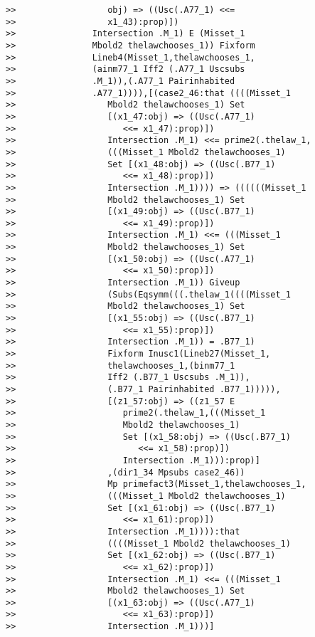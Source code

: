 \documentclass[12pt]{article}
\begin{document}
\begin{verbatim}
>>                  obj) => ((Usc(.A77_1) <<=
>>                  x1_43):prop)])
>>               Intersection .M_1) E (Misset_1
>>               Mbold2 thelawchooses_1)) Fixform
>>               Lineb4(Misset_1,thelawchooses_1,
>>               (ainm77_1 Iff2 (.A77_1 Uscsubs
>>               .M_1)),(.A77_1 Pairinhabited
>>               .A77_1)))),[(case2_46:that ((((Misset_1
>>                  Mbold2 thelawchooses_1) Set
>>                  [(x1_47:obj) => ((Usc(.A77_1)
>>                     <<= x1_47):prop)])
>>                  Intersection .M_1) <<= prime2(.thelaw_1,
>>                  (((Misset_1 Mbold2 thelawchooses_1)
>>                  Set [(x1_48:obj) => ((Usc(.B77_1)
>>                     <<= x1_48):prop)])
>>                  Intersection .M_1)))) => ((((((Misset_1
>>                  Mbold2 thelawchooses_1) Set
>>                  [(x1_49:obj) => ((Usc(.B77_1)
>>                     <<= x1_49):prop)])
>>                  Intersection .M_1) <<= (((Misset_1
>>                  Mbold2 thelawchooses_1) Set
>>                  [(x1_50:obj) => ((Usc(.A77_1)
>>                     <<= x1_50):prop)])
>>                  Intersection .M_1)) Giveup
>>                  (Subs(Eqsymm(((.thelaw_1((((Misset_1
>>                  Mbold2 thelawchooses_1) Set
>>                  [(x1_55:obj) => ((Usc(.B77_1)
>>                     <<= x1_55):prop)])
>>                  Intersection .M_1)) = .B77_1)
>>                  Fixform Inusc1(Lineb27(Misset_1,
>>                  thelawchooses_1,(binm77_1
>>                  Iff2 (.B77_1 Uscsubs .M_1)),
>>                  (.B77_1 Pairinhabited .B77_1))))),
>>                  [(z1_57:obj) => ((z1_57 E
>>                     prime2(.thelaw_1,(((Misset_1
>>                     Mbold2 thelawchooses_1)
>>                     Set [(x1_58:obj) => ((Usc(.B77_1)
>>                        <<= x1_58):prop)])
>>                     Intersection .M_1))):prop)]
>>                  ,(dir1_34 Mpsubs case2_46))
>>                  Mp primefact3(Misset_1,thelawchooses_1,
>>                  (((Misset_1 Mbold2 thelawchooses_1)
>>                  Set [(x1_61:obj) => ((Usc(.B77_1)
>>                     <<= x1_61):prop)])
>>                  Intersection .M_1)))):that
>>                  ((((Misset_1 Mbold2 thelawchooses_1)
>>                  Set [(x1_62:obj) => ((Usc(.B77_1)
>>                     <<= x1_62):prop)])
>>                  Intersection .M_1) <<= (((Misset_1
>>                  Mbold2 thelawchooses_1) Set
>>                  [(x1_63:obj) => ((Usc(.A77_1)
>>                     <<= x1_63):prop)])
>>                  Intersection .M_1)))]

\end{verbatim}
\end{document}
